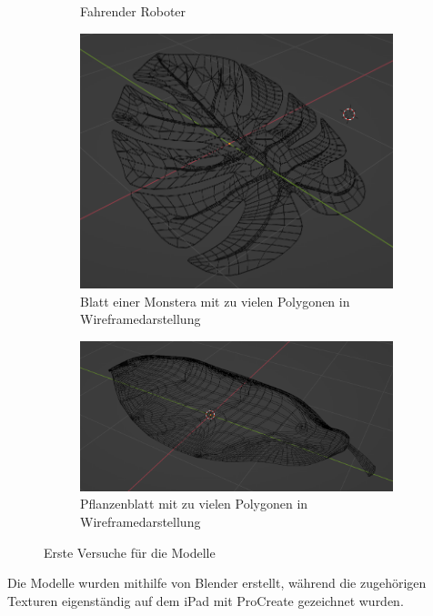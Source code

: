\begin{figure}[H]
\begin{subfigure}{0.5\textwidth}
		\caption{Fahrender Roboter}
	\end{subfigure}
	\begin{subfigure}{0.5\textwidth}
		\centering
		\includegraphics[height=0.3\pageheight,keepaspectratio]{pics/8}
		\caption{Blatt einer Monstera mit zu vielen Polygonen in Wireframedarstellung}
	\end{subfigure}
	\begin{subfigure}{0.5\textwidth}
		\centering
		\includegraphics[height=0.3\pageheight,keepaspectratio]{pics/9}
		\caption{Pflanzenblatt mit zu vielen Polygonen in Wireframedarstellung}
	\end{subfigure}
	\caption{Erste Versuche für die Modelle}
\end{figure}
\par
Die Modelle wurden mithilfe von Blender erstellt, während die zugehörigen Texturen eigenständig auf dem iPad mit ProCreate gezeichnet wurden.
\par
